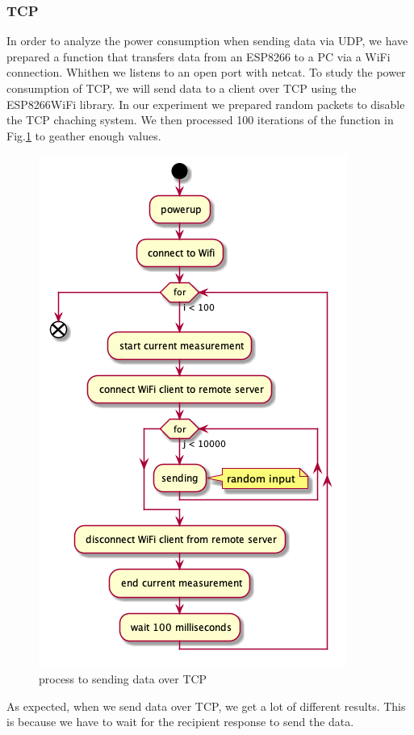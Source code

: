 \subsubsection{TCP}
In order to analyze the power consumption when sending data via UDP,
we have prepared a function that transfers data from an ESP8266 to a PC via a WiFi connection.
Whithen we listens to an open port with netcat.
To study the power consumption of TCP,
we will send data to a client over TCP using the ESP8266WiFi library.
In our experiment we prepared random packets to disable the TCP chaching system.
We then processed 100 iterations of the function in Fig.\ref{fig:tcp_uml}
to geather enough values.
\begin{figure}[h]
\centering
\includegraphics[width = 0.7 \linewidth]{fig/udp_tcp/tcp_uml.png}
\caption{process to sending data over TCP}
\label{fig:tcp_uml}
\end{figure}
\newline\newline
As expected, when we send data over TCP, we get a lot of different results.
This is because we have to wait for the recipient response to send the data.
\linebreak\linebreak
